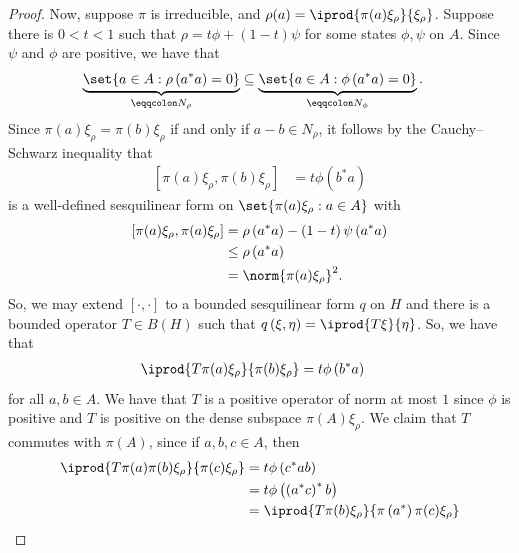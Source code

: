 \documentclass[10pt]{mypackage}
\renewcommand{\eqcolon}{\eqqcolon}
\begin{document}
\begin{proof}
  Now, suppose $\pi$ is irreducible, and $\rho(a) = \iprod{\pi(a)\xi_{\rho}}{\xi_{\rho}}$. Suppose there is $0 < t < 1$ such that $\rho = t\phi + \left( 1-t \right)\psi$ for some states $\phi,\psi$ on $A$. Since $\psi$ and $\phi$ are positive, we have that
  \begin{align*}
    \underbrace{\set{a\in A : \rho\left( a^{\ast}a \right) = 0}}_{\eqcolon N_{\rho}} &\subseteq \underbrace{\set{a\in A : \phi\left( a^{\ast}a \right) = 0}}_{\eqcolon N_{\phi}}.
  \end{align*}
  Since $\pi(a)\xi_{\rho} = \pi(b)\xi_{\rho}$ if and only if $a-b\in N_{\rho}$, it follows by the Cauchy--Schwarz inequality that
  \begin{align*}
    \left[ \pi(a)\xi_{\rho},\pi(b)\xi_{\rho} \right] &= t\phi\left( b^{\ast}a \right)
  \end{align*}
  is a well-defined sesquilinear form on $\set{\pi(a)\xi_{\rho} : a\in A}$ with
  \begin{align*}
    \left[ \pi(a)\xi_{\rho},\pi(a)\xi_{\rho} \right] &= \rho\left( a^{\ast}a \right) - \left( 1-t \right)\psi\left( a^{\ast}a \right)\\
                                                     &\leq \rho\left( a^{\ast}a \right)\\
                                                     &= \norm{\pi(a)\xi_{\rho}}^2.
  \end{align*}
  So, we may extend $\left[ \cdot,\cdot \right]$ to a bounded sesquilinear form $q$ on $H$ and there is a bounded operator $T\in B\left( H \right)$ such that $q\left( \xi,\eta \right) = \iprod{T\xi}{\eta}$. So, we have that
  \begin{align*}
    \iprod{T\pi(a)\xi_{\rho}}{\pi(b)\xi_{\rho}} &= t\phi\left( b^{\ast}a \right)
  \end{align*}
  for all $a,b\in A$. We have that $T$ is a positive operator of norm at most $1$ since $\phi$ is positive and $T$ is positive on the dense subspace $\pi(A)\xi_{\rho}$. We claim that $T$ commutes with $\pi(A)$, since if $a,b,c\in A$, then
  \begin{align*}
    \iprod{T\pi(a)\pi(b)\xi_{\rho}}{\pi(c)\xi_{\rho}} &= t\phi\left( c^{\ast}ab \right)\\
                                                      &= t\phi\left( \left( a^{\ast}c \right)^{\ast}b \right)\\
                                                      &= \iprod{T\pi(b)\xi_{\rho}}{\pi\left( a^{\ast} \right)\pi(c)\xi_{\rho}}\\

\end{align*}
\end{proof}
\end{document}
